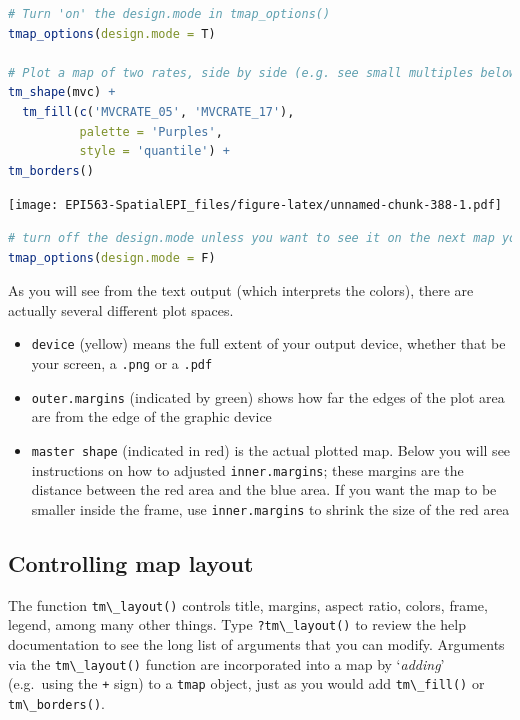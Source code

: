 \documentclass[
]{book}
\newcommand{\passthrough}[1]{#1}
\providecommand{\tightlist}{%
  \setlength{\itemsep}{0pt}\setlength{\parskip}{0pt}}
\begin{document}
\begin{lstlisting}[language=R]
# Turn 'on' the design.mode in tmap_options()
tmap_options(design.mode = T)

# Plot a map of two rates, side by side (e.g. see small multiples below)
tm_shape(mvc) + 
  tm_fill(c('MVCRATE_05', 'MVCRATE_17'),
          palette = 'Purples',
          style = 'quantile') +
tm_borders()
\end{lstlisting}

\texttt{[image: EPI563-SpatialEPI\_files/figure-latex/unnamed-chunk-388-1.pdf]}

\begin{lstlisting}[language=R]
# turn off the design.mode unless you want to see it on the next map you plot
tmap_options(design.mode = F)
\end{lstlisting}

As you will see from the text output (which interprets the colors), there are actually several different plot spaces.

\begin{itemize}
\tightlist
\item
  \passthrough{\lstinline!device!} (yellow) means the full extent of your output device, whether that be your screen, a \passthrough{\lstinline!.png!} or a \passthrough{\lstinline!.pdf!}
\item
  \passthrough{\lstinline!outer.margins!} (indicated by green) shows how far the edges of the plot area are from the edge of the graphic device
\item
  \passthrough{\lstinline!master shape!} (indicated in red) is the actual plotted map. Below you will see instructions on how to adjusted \passthrough{\lstinline!inner.margins!}; these margins are the distance between the red area and the blue area. If you want the map to be smaller inside the frame, use \passthrough{\lstinline!inner.margins!} to shrink the size of the red area
\end{itemize}

\hypertarget{controlling-map-layout}{%
\subsection{Controlling map layout}\label{controlling-map-layout}}

The function \passthrough{\lstinline!tm\_layout()!} controls title, margins, aspect ratio, colors, frame, legend, among many other things. Type \passthrough{\lstinline!?tm\_layout()!} to review the help documentation to see the long list of arguments that you can modify. Arguments via the \passthrough{\lstinline!tm\_layout()!} function are incorporated into a map by `\emph{adding}' (e.g.~using the \passthrough{\lstinline!+!} sign) to a \passthrough{\lstinline!tmap!} object, just as you would add \passthrough{\lstinline!tm\_fill()!} or \passthrough{\lstinline!tm\_borders()!}.
\end{document}
